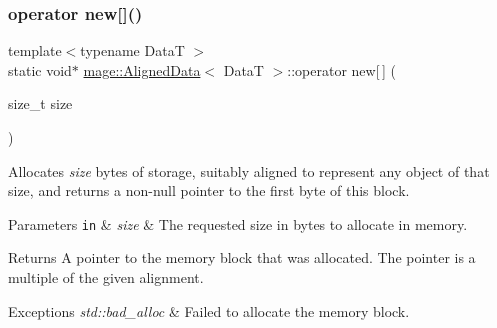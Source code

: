 \subsubsection{\texorpdfstring{operator new[]()}{operator new[]()}}
{\footnotesize\ttfamily template$<$typename DataT $>$ \\
static void$\ast$ \hyperlink{structmage_1_1_aligned_data}{mage\+::\+Aligned\+Data}$<$ DataT $>$\+::operator new\mbox{[}$\,$\mbox{]} (\begin{DoxyParamCaption}\item[{size\+\_\+t}]{size }\end{DoxyParamCaption})\hspace{0.3cm}{\ttfamily [static]}}

Allocates {\itshape size} bytes of storage, suitably aligned to represent any object of that size, and returns a non-\/null pointer to the first byte of this block.


\begin{DoxyParams}[1]{Parameters}
\mbox{\tt in}  & {\em size} & The requested size in bytes to allocate in memory. \\
\hline
\end{DoxyParams}
\begin{DoxyReturn}{Returns}
A pointer to the memory block that was allocated. The pointer is a multiple of the given alignment. 
\end{DoxyReturn}

\begin{DoxyExceptions}{Exceptions}
{\em std\+::bad\+\_\+alloc} & Failed to allocate the memory block. \\
\hline
\end{DoxyExceptions}
